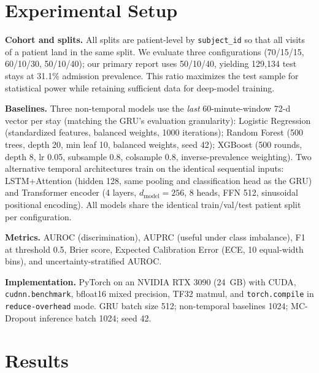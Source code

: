 \documentclass[runningheads]{llncs}
\begin{document}
\section{Experimental Setup}

\textbf{Cohort and splits.} All splits are patient-level by \texttt{subject\_id} so that all visits of a patient land in the same split. We evaluate three configurations (70/15/15, 60/10/30, 50/10/40); our primary report uses 50/10/40, yielding 129{,}134 test stays at 31.1\% admission prevalence. This ratio maximizes the test sample for statistical power while retaining sufficient data for deep-model training.

\textbf{Baselines.} Three non-temporal models use the \textit{last} 60-minute-window 72-d vector per stay (matching the GRU's evaluation granularity): Logistic Regression (standardized features, balanced weights, 1000 iterations); Random Forest (500 trees, depth 20, min leaf 10, balanced weights, seed 42); XGBoost (500 rounds, depth 8, lr 0.05, subsample 0.8, colsample 0.8, inverse-prevalence weighting). Two alternative temporal architectures train on the identical sequential inputs: LSTM+Attention (hidden 128, same pooling and classification head as the GRU) and Transformer encoder (4 layers, $d_\text{model}=256$, 8 heads, FFN 512, sinusoidal positional encoding). All models share the identical train/val/test patient split per configuration.

\textbf{Metrics.} AUROC (discrimination), AUPRC (useful under class imbalance), F1 at threshold 0.5, Brier score, Expected Calibration Error (ECE, 10 equal-width bins), and uncertainty-stratified AUROC.

\textbf{Implementation.} PyTorch on an NVIDIA RTX 3090 (24~GB) with CUDA, \texttt{cudnn.benchmark}, bfloat16 mixed precision, TF32 matmul, and \texttt{torch.compile} in \texttt{reduce-overhead} mode. GRU batch size 512; non-temporal baselines 1024; MC-Dropout inference batch 1024; seed 42.

\section{Results}
\end{document}
